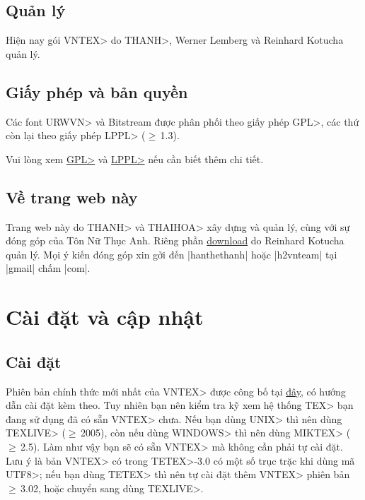 \documentclass[12pt,a4paper]{article}
\begin{document}
\subsection{Quản lý}
Hiện nay gói \<VNTEX> do \<THANH>, Werner Lemberg và Reinhard Kotucha quản
lý.

\subsection{Giấy phép và bản quyền}
Các font \<URWVN> và Bitstream được phân phối theo giấy phép
\<GPL>, các thứ còn lại theo giấy phép \<LPPL> ($\ge$\,1.3).

Vui lòng xem \href{http://www.gnu.org/licenses/gpl.txt}{\<GPL>} và
\href{http://www.latex-project.org/lppl.txt}{\<LPPL>} nếu cần biết thêm chi tiết.

\subsection{Về trang web này}
Trang web này do \<THANH> và \<THAIHOA> xây dựng và quản lý, cùng với
sự đóng góp của Tôn Nữ Thục Anh. Riêng phần
\href{http://vntex.org/download}{download} do Reinhard Kotucha quản
lý. Mọi ý kiến đóng góp xin gởi đến |hanthethanh| hoặc |h2vnteam| tại
|gmail| chấm |com|.

\section{Cài đặt và cập nhật}
\subsection{Cài đặt}
Phiên bản chính thức mới nhất của \<VNTEX> được công bố tại
\href{http://vntex.org/download/vntex}{đây}, có hướng dẫn cài đặt kèm theo.  Tuy nhiên
bạn nên kiểm tra kỹ xem hệ thống \<TEX> bạn đang sử dụng đã có sẵn
\<VNTEX> chưa. Nếu bạn dùng \<UNIX> thì nên dùng \<TEXLIVE>
($\ge$\,2005), còn nếu dùng \<WINDOWS> thì nên dùng \<MIKTEX>
($\ge$\,2.5). Làm như vậy bạn sẽ có sẵn \<VNTEX> mà không cần phải tự
cài đặt. Lưu ý là bản \<VNTEX> có trong \<TETEX>-3.0 có một số trục
trặc khi dùng mã \<UTF8>; nếu bạn dùng \<TETEX> thì nên tự cài đặt
thêm \<VNTEX> phiên bản $\ge$\,3.02, hoặc chuyển sang dùng \<TEXLIVE>.
\end{document}
